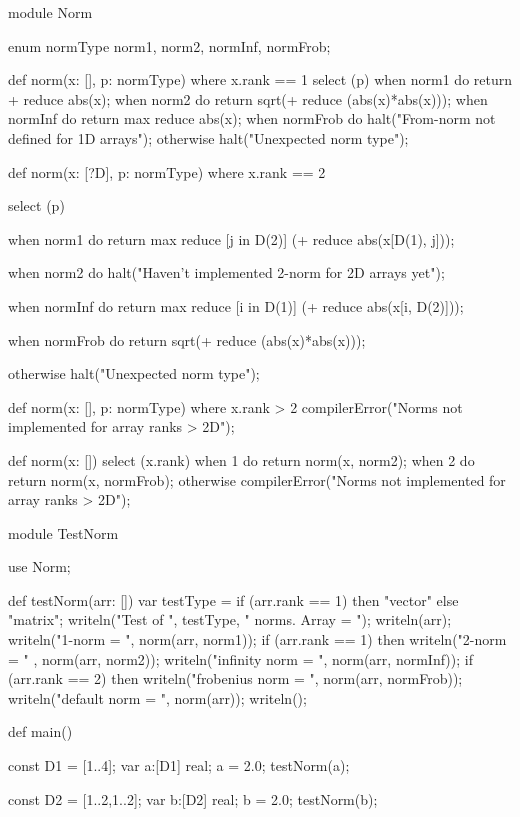 \begin{numberedchapel}
module Norm{
  enum normType {norm1, norm2, normInf, normFrob};

  def norm(x: [], p: normType) where x.rank == 1 {
    select (p) {
      when norm1 do return + reduce abs(x);
      when norm2 do return sqrt(+ reduce (abs(x)*abs(x)));
      when normInf do return max reduce abs(x);
      when normFrob do halt("From-norm not defined for 1D arrays");
      otherwise halt("Unexpected norm type");
    }
  }

  def norm(x: [?D], p: normType) where x.rank == 2 {
    select (p) {
      when norm1 do
        return max reduce [j in D(2)] (+ reduce abs(x[D(1), j]));

      when norm2 do
        halt("Haven't implemented 2-norm for 2D arrays yet");

      when normInf do
        return max reduce [i in D(1)] (+ reduce abs(x[i, D(2)]));

      when normFrob do return sqrt(+ reduce (abs(x)*abs(x)));

      otherwise halt("Unexpected norm type");
    }
  }

  def norm(x: [], p: normType) where x.rank > 2 {
    compilerError("Norms not implemented for array ranks > 2D");
  }

  def norm(x: []) {
    select (x.rank) {
      when 1 do return norm(x, norm2);
      when 2 do return norm(x, normFrob);
      otherwise compilerError("Norms not implemented for array ranks > 2D");
    }
  }
}

module TestNorm {
  use Norm;

  def testNorm(arr: []) {
    var testType = if (arr.rank == 1) then "vector" else "matrix";
    writeln("Test of ", testType, " norms.  Array = ");
    writeln(arr);
    writeln("1-norm = ", norm(arr, norm1));
    if (arr.rank == 1) then
      writeln("2-norm = " , norm(arr, norm2));
    writeln("infinity norm = ", norm(arr, normInf));
    if (arr.rank == 2) then
      writeln("frobenius norm = ", norm(arr, normFrob));
    writeln("default norm = ", norm(arr));
    writeln();
  }

  def main() {
    const D1 = [1..4];
    var a:[D1] real;
    a = 2.0;
    testNorm(a);

    const D2 = [1..2,1..2];
    var b:[D2] real;
    b = 2.0;
    testNorm(b);
  }
}
\end{numberedchapel}

